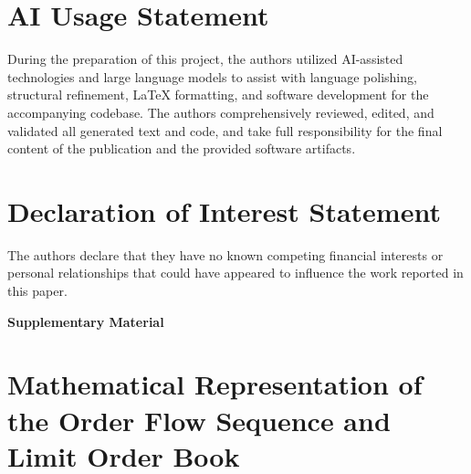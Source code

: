 \documentclass[10pt,a4paper,oneside]{article}
\begin{document}
\section*{AI Usage Statement}
During the preparation of this project, the authors utilized AI-assisted technologies and large language models to assist with language polishing, structural refinement, LaTeX formatting, and software development for the accompanying codebase. The authors comprehensively reviewed, edited, and validated all generated text and code, and take full responsibility for the final content of the publication and the provided software artifacts.

\section*{Declaration of Interest Statement}
The authors declare that they have no known competing financial interests or personal relationships that could have appeared to influence the work reported in this paper.

\newpage




\newpage

\clearpage
\appendix

\vspace*{2em}
\begin{center}
    \LARGE \textbf{Supplementary Material} \\[0.5em]
\end{center}
\vspace{2em}


\begingroup
{}
\setcounter{tocdepth}{3}
\tableofcontents
\endgroup
\vspace{1em}

\setcounter{table}{0}
\renewcommand{\thetable}{S\arabic{table}}
\setcounter{figure}{0}
\renewcommand{\thefigure}{S\arabic{figure}}
\setcounter{equation}{0}
\renewcommand{\theequation}{S\arabic{equation}}
\setcounter{page}{1} %

\newpage

\section{Mathematical Representation of the Order Flow Sequence and Limit Order Book}
\label{ap:matreplob}
\end{document}
